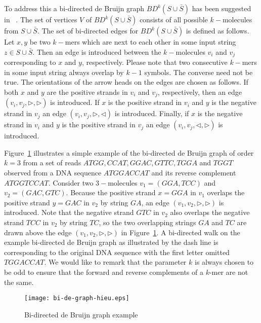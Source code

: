 \documentclass[11pt,conference,twocolumn]{IEEEtran}
\begin{document}
To address this a bi-directed de Bruijn graph $BD^k(S\cup \bar{S})$ has been suggested in ~\cite{bidirected_graph}. 
The set of vertices $V$ of $BD^k(S\cup \bar{S})$ consists of all possible $k-$molecules from $S\cup\bar{S}$. 
The set of bi-directed edges for $BD^k(S\cup \bar{S})$ is defined as follows. Let $x,y$ be two $k-$mers 
which are next to each other in some input string $z \in S\cup \bar{S}$. Then an edge is introduced between the 
$k-$molecules $v_i$ and $v_j$ corresponding to $x$ and $y$, respectively. Please note that two consecutive $k-$mers in some input 
string always overlap by $k-1$ symbols. The converse need not be true. The orientations of the arrow heads on the 
edges are chosen as follows. If both $x$ and $y$ are the positive strands in $v_i$ and $v_j$, respectively,
then an edge $(v_i,v_j,\rhd,\rhd)$ 
is introduced. If $x$ is the positive strand in $v_i$ and $y$ is the negative strand in $v_j$ an edge $(v_i,v_j,\rhd,\lhd)$ 
is introduced. Finally, if $x$ is the negative strand in $v_i$ and $y$ is the positive strand in $v_j$ an 
edge $(v_i,v_j,\lhd,\rhd)$ is introduced. 

Figure~\ref{fig:bi-de-graph-hieu} illustrates a simple example of
the bi-directed de Bruijn graph of order $k=3$ from a set of reads
$ATGG,CCAT, GGAC, GTTC, TGGA$ and $TGGT$ observed from a DNA
sequence $ATGGACCAT$ and its reverse complement $ATGGTCCAT$.
Consider two $3-$molecules $v_1=(GGA,TCC)$ and $v_2=(GAC,GTC)$.
Because the positive strand $x=GGA$ in $v_1$ overlaps the positive
strand $y=GAC$ in $v_2$ by string $GA$, an edge
$(v_1,v_2,\rhd,\rhd)$ is introduced. Note that the negative strand
$GTC$ in $v_2$ also overlaps the negative strand $TCC$ in $v_2$ by
string $TC$, so the two overlapping strings $GA$ and $TC$ are drawn
above the edge $(v_1,v_2,\rhd,\rhd)$ in
Figure~\ref{fig:bi-de-graph-hieu}. A bi-directed walk on the example
bi-directed de Bruijn graph as illustrated by the dash line is
corresponding to the original DNA sequence with the first letter
omitted $TGGACCAT$. We would like to remark that the parameter $k$
is always chosen to be odd to ensure that the forward and reverse
complements of a $k$-mer are not the same.

\begin{figure}
\begin{center}
\texttt{[image: bi-de-graph-hieu.eps]}
\end{center}
\caption{Bi-directed de Bruijn graph example}
\label{fig:bi-de-graph-hieu}
\end{figure}
\end{document}
